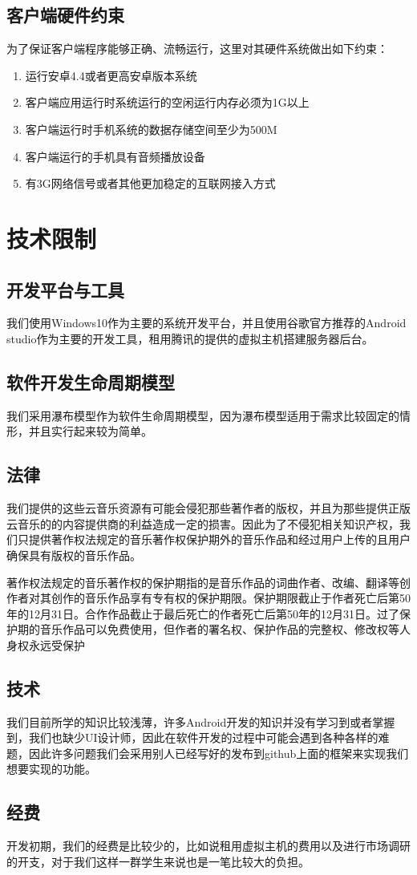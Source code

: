 \subsection{客户端硬件约束}
为了保证客户端程序能够正确、流畅运行，这里对其硬件系统做出如下约束：
\begin{enumerate}
	\item 运行安卓4.4或者更高安卓版本系统
	\item 客户端应用运行时系统运行的空闲运行内存必须为1G以上
	\item 客户端运行时手机系统的数据存储空间至少为500M
	\item 客户端运行的手机具有音频播放设备
	\item 有3G网络信号或者其他更加稳定的互联网接入方式
\end{enumerate}
\section{技术限制}
\subsection{开发平台与工具}
我们使用Windows10作为主要的系统开发平台，并且使用谷歌官方推荐的Android studio作为主要的开发工具，租用腾讯的提供的虚拟主机搭建服务器后台。

\subsection{软件开发生命周期模型}
我们采用瀑布模型作为软件生命周期模型，因为瀑布模型适用于需求比较固定的情形，并且实行起来较为简单。  

\subsection{法律}
我们提供的这些云音乐资源有可能会侵犯那些著作者的版权，并且为那些提供正版云音乐的的内容提供商的利益造成一定的损害。因此为了不侵犯相关知识产权，我们只提供著作权法规定的音乐著作权保护期外的音乐作品和经过用户上传的且用户确保具有版权的音乐作品。

著作权法规定的音乐著作权的保护期指的是音乐作品的词曲作者、改编、翻译等创作者对其创作的音乐作品享有专有权的保护期限。保护期限截止于作者死亡后第50年的12月31日。合作作品截止于最后死亡的作者死亡后第50年的12月31日。过了保护期的音乐作品可以免费使用，但作者的署名权、保护作品的完整权、修改权等人身权永远受保护


\subsection{技术}
我们目前所学的知识比较浅薄，许多Android开发的知识并没有学习到或者掌握到，我们也缺少UI设计师，因此在软件开发的过程中可能会遇到各种各样的难题，因此许多问题我们会采用别人已经写好的发布到github上面的框架来实现我们想要实现的功能。  

\subsection{经费}
开发初期，我们的经费是比较少的，比如说租用虚拟主机的费用以及进行市场调研的开支，对于我们这样一群学生来说也是一笔比较大的负担。
